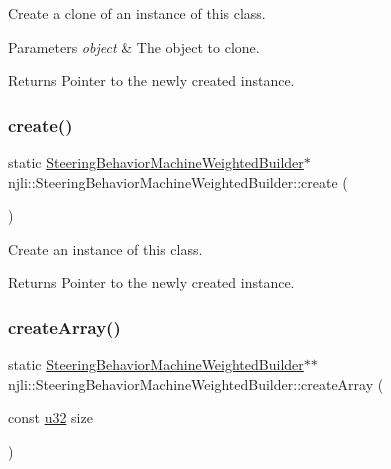 Create a clone of an instance of this class.


\begin{DoxyParams}{Parameters}
{\em object} & The object to clone.\\
\hline
\end{DoxyParams}
\begin{DoxyReturn}{Returns}
Pointer to the newly created instance. 
\end{DoxyReturn}
\mbox{\label{classnjli_1_1_steering_behavior_machine_weighted_builder_a8ddc9325c307cf5fc3f337bd26449fca}} 
\subsubsection{\texorpdfstring{create()}{create()}}
{\footnotesize\ttfamily static \mbox{\hyperlink{classnjli_1_1_steering_behavior_machine_weighted_builder}{Steering\+Behavior\+Machine\+Weighted\+Builder}}$\ast$ njli\+::\+Steering\+Behavior\+Machine\+Weighted\+Builder\+::create (\begin{DoxyParamCaption}{ }\end{DoxyParamCaption})\hspace{0.3cm}{\ttfamily [static]}}

Create an instance of this class.

\begin{DoxyReturn}{Returns}
Pointer to the newly created instance. 
\end{DoxyReturn}
\mbox{\label{classnjli_1_1_steering_behavior_machine_weighted_builder_a187542b0a31cc014a355dfd77f7f56a5}} 
\subsubsection{\texorpdfstring{create\+Array()}{createArray()}}
{\footnotesize\ttfamily static \mbox{\hyperlink{classnjli_1_1_steering_behavior_machine_weighted_builder}{Steering\+Behavior\+Machine\+Weighted\+Builder}}$\ast$$\ast$ njli\+::\+Steering\+Behavior\+Machine\+Weighted\+Builder\+::create\+Array (\begin{DoxyParamCaption}\item[{const \mbox{\hyperlink{_util_8h_a10e94b422ef0c20dcdec20d31a1f5049}{u32}}}]{size }\end{DoxyParamCaption})\hspace{0.3cm}{\ttfamily [static]}}

